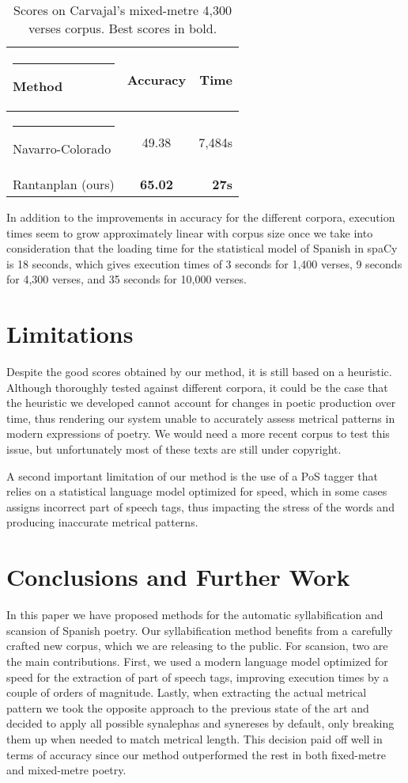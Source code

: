 \documentclass[a4paper,11pt,twocolumn,twoside]{article}
\begin{document}
\begin{table} [htbp]
\begin{center}
\begin{tabular} {lcr}
  \hline\rule{-2pt}{15pt}
  {\bf Method} & {\bf Accuracy} & {\bf Time}\\
  \hline\rule{-4pt}{10pt}
Navarro-Colorado & 49.38 & 7,484s \\
Rantanplan (ours) & \textbf{65.02} & \textbf{27s} \\
\hline
\end{tabular}
\end{center}
\caption{\label{table.4}Scores on Carvajal's mixed-metre 4,300 verses corpus. Best scores in bold.}
\end{table}

In addition to the improvements in accuracy for the different corpora, execution times seem to grow approximately linear with corpus size once we take into consideration that the loading time for the statistical model of Spanish in spaCy is 18 seconds, which gives execution times of 3 seconds for 1,400 verses, 9 seconds for 4,300 verses, and 35 seconds for 10,000 verses.

\section{Limitations}
Despite the good scores obtained by our method, it is still based on a heuristic. Although thoroughly tested against different corpora, it could be the case that the heuristic we developed cannot account for changes in poetic production over time, thus rendering our system unable to accurately assess metrical patterns in modern expressions of poetry. We would need a more recent corpus to test this issue, but unfortunately most of these texts are still under copyright.

A second important limitation of our method is the use of a PoS tagger that relies on a statistical language model optimized for speed, which in some cases assigns incorrect part of speech tags, thus impacting the stress of the words and producing inaccurate metrical patterns.

\section{Conclusions and Further Work}
In this paper we have proposed methods for the automatic syllabification and scansion of Spanish poetry. Our syllabification method benefits from a carefully crafted new corpus, which we are releasing to the public. For scansion, two are the main contributions. First, we used a modern language model optimized for speed for the extraction of part of speech tags, improving execution times by a couple of orders of magnitude. Lastly, when extracting the actual metrical pattern we took the opposite approach to the previous state of the art and decided to apply all possible synalephas and synereses by default, only breaking them up when needed to match metrical length. This decision paid off  well in terms of accuracy since our method outperformed the rest in both fixed-metre and mixed-metre poetry.
\end{document}
